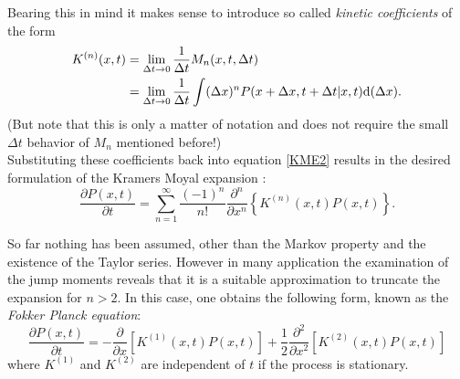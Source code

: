 Bearing this in mind it makes sense to introduce so called \emph{kinetic coefficients} of the form
\begin{align}
    K^{(n)}(x,t) &= \lim_{\Delta t \rightarrow 0} \frac{1}{ \Delta t } M_n(x,t,\Delta t) \nonumber \\
    &=\lim_{\Delta t \rightarrow 0} \frac{1}{\Delta t} \int (\Delta x)^n P(x+\Delta x,t+\Delta t|x,t) {\rm d}(\Delta x) .
    \label{kinetic_coefficients}
\end{align}
(But note that this is only a matter of notation and does not require the small $\Delta t$ behavior of $M_n$ mentioned  before!) \\
Substituting these coefficients back into equation \eqref{KME2} results in the desired formulation of the Kramers Moyal expansion \cite{Moyal1949}:
\begin{equation}
    \frac{\partial P(x,t)}{\partial t} = \sum_{n = 1}^{\infty}\frac{(-1)^{n}}{n!}\frac{\partial^n}{\partial x^n} \left\{ K^{(n)}(x,t) P(x,t) \right\}.
    \label{Kramers Moyal expansion}
\end{equation}

So far nothing has been assumed, other than the Markov property and the existence of the Taylor series. However in many application the examination of the jump moments reveals that it is a suitable approximation to truncate the expansion for $n>2$. In this case, one obtains the following form, known as the \textit{Fokker Planck equation}:
\begin{equation}
    \frac{\partial P(x,t)}{\partial t} = - \frac{\partial}{\partial x} \left[K^{(1)}(x,t)P(x,t) \right] + \frac{1}{2}\frac{\partial^2}{\partial x^2}\left[ K^{(2)}(x,t)P(x,t) \right] 
    \label{FPE}
\end{equation}
where $K^{(1)}$ and $K^{(2)}$ are independent of $t$ if the process is stationary. \\
